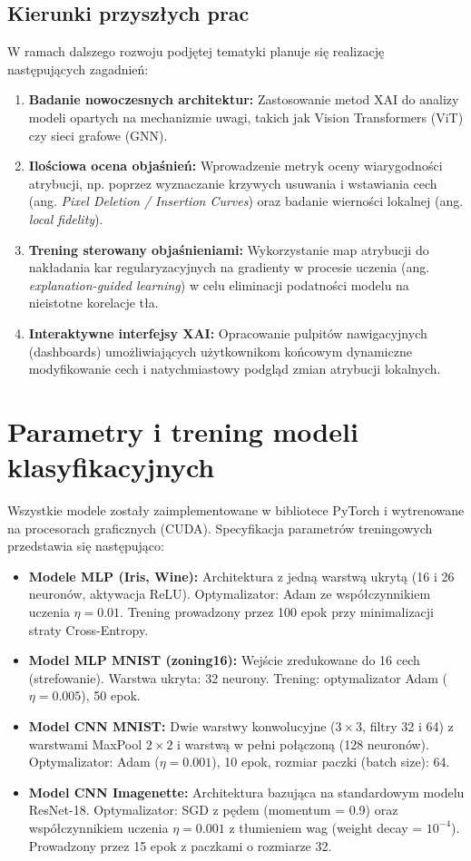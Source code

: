 \documentclass[conference]{IEEEtran}
\begin{document}
\subsection{Kierunki przyszłych prac}
W ramach dalszego rozwoju podjętej tematyki planuje się realizację następujących zagadnień:
\begin{enumerate}
    \item \textbf{Badanie nowoczesnych architektur:} Zastosowanie metod XAI do analizy modeli opartych na mechanizmie uwagi, takich jak Vision Transformers (ViT) czy sieci grafowe (GNN).
    \item \textbf{Ilościowa ocena objaśnień:} Wprowadzenie metryk oceny wiarygodności atrybucji, np. poprzez wyznaczanie krzywych usuwania i wstawiania cech (ang. \textit{Pixel Deletion / Insertion Curves}) oraz badanie wierności lokalnej (ang. \textit{local fidelity}).
    \item \textbf{Trening sterowany objaśnieniami:} Wykorzystanie map atrybucji do nakładania kar regularyzacyjnych na gradienty w procesie uczenia (ang. \textit{explanation-guided learning}) w celu eliminacji podatności modelu na nieistotne korelacje tła.
    \item \textbf{Interaktywne interfejsy XAI:} Opracowanie pulpitów nawigacyjnych (dashboards) umożliwiających użytkownikom końcowym dynamiczne modyfikowanie cech i natychmiastowy podgląd zmian atrybucji lokalnych.
\end{enumerate}

\appendix
\section{Parametry i trening modeli klasyfikacyjnych}
Wszystkie modele zostały zaimplementowane w bibliotece PyTorch i wytrenowane na procesorach graficznych (CUDA). Specyfikacja parametrów treningowych przedstawia się następująco:
\begin{itemize}
    \item \textbf{Modele MLP (Iris, Wine):} Architektura z jedną warstwą ukrytą (16 i 26 neuronów, aktywacja ReLU). Optymalizator: Adam ze współczynnikiem uczenia $\eta = 0.01$. Trening prowadzony przez 100 epok przy minimalizacji straty Cross-Entropy.
    \item \textbf{Model MLP MNIST (zoning16):} Wejście zredukowane do 16 cech (strefowanie). Warstwa ukryta: 32 neurony. Trening: optymalizator Adam ($\eta = 0.005$), 50 epok.
    \item \textbf{Model CNN MNIST:} Dwie warstwy konwolucyjne ($3 \times 3$, filtry 32 i 64) z warstwami MaxPool $2 \times 2$ i warstwą w pełni połączoną (128 neuronów). Optymalizator: Adam ($\eta = 0.001$), 10 epok, rozmiar paczki (batch size): 64.
    \item \textbf{Model CNN Imagenette:} Architektura bazująca na standardowym modelu ResNet-18. Optymalizator: SGD z pędem (momentum = 0.9) oraz współczynnikiem uczenia $\eta = 0.001$ z tłumieniem wag (weight decay = $10^{-4}$). Prowadzony przez 15 epok z paczkami o rozmiarze 32.
\end{itemize}
\end{document}
